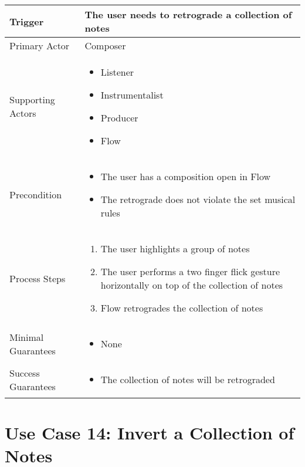   \begin{tabularx}{\textwidth}{|X|X|}
  \hline
  Trigger & 
  The user needs to retrograde a collection of notes \\
  \hline
  Primary Actor & 
  Composer \\
  \hline
  Supporting Actors & 
  \begin{itemize}
  \item Listener
  \item Instrumentalist
  \item Producer
  \item Flow
  \end{itemize} \\
  \hline
  Precondition & 
  \begin{itemize}
  \item The user has a composition open in Flow
  \item The retrograde does not violate the set musical rules
  \end{itemize} \\
  \hline
  Process Steps & 
  \begin{enumerate}
  \item The user highlights a group of notes
  \item The user performs a two finger flick gesture horizontally on top of the collection of notes
  \item Flow retrogrades the collection of notes
  \end{enumerate} \\
  \hline
  Minimal Guarantees & 
  \begin{itemize}
    \item None
  \end{itemize} \\
  \hline
  Success Guarantees & 
  \begin{itemize}
    \item The collection of notes will be retrograded
  \end{itemize} \\
  \hline
  \end{tabularx}

  \section{Use Case 14: Invert a Collection of Notes}


